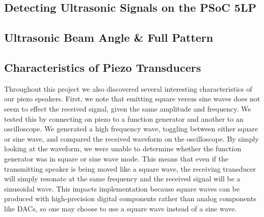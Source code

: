 \documentclass{article}
\begin{document}
  \subsection{Detecting Ultrasonic Signals on the PSoC 5LP}



  \subsection{Ultrasonic Beam Angle \& Full Pattern}


  \subsection{Characteristics of Piezo Transducers}

    Throughout this project we also discovered several interesting characteristics of our piezo speakers. First, we note that emitting square versus sine waves does not seem to effect the received signal, given the same amplitude and frequency. We tested this by connecting on piezo to a function generator and another to an oscilloscope. We generated a high frequency wave, toggling between either square or sine wave, and compared the received waveform on the oscilloscope. By simply looking at the waveform, we were unable to determine whether the function generator was in square or sine wave mode. This means that even if the transmitting speaker is being moved like a square wave, the receiving transducer will simply resonate at the same frequency and the received signal will be a sinusoidal wave. This impacts implementation because square waves can be produced with high-precision digital components rather than analog components like DACs, so one may choose to use a square wave instead of a sine wave.
\end{document}
